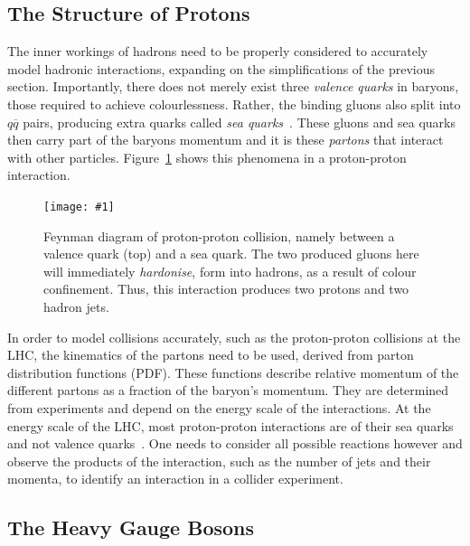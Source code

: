 \documentclass[twocolumn]{article}
\newcommand{\insertFigure}[1]{%
   \texttt{[image: \#1]}%
}
\begin{document}
\subsection{The Structure of Protons} 
The inner workings of hadrons need to be properly considered to accurately model hadronic interactions, expanding on the simplifications of the previous section. Importantly, there does not merely exist three \textsl{valence quarks} in baryons, those required to achieve colourlessness. Rather, the binding gluons also split into $q\overline{q}$ pairs, producing extra quarks called \textsl{sea quarks}~\cite{manual}. These gluons and sea quarks then carry part of the baryons momentum and it is these \textsl{partons} that interact with other particles. Figure~\ref{fig:parton} shows this phenomena in a proton-proton interaction.
\begin{figure}[!h]
	\centering
	\insertFigure{Images/parton.png}
	\caption{Feynman diagram of proton-proton collision, namely between a valence quark (top) and a sea quark. The two produced gluons here will immediately \textsl{hardonise}, form into hadrons, as a result of colour confinement. Thus, this interaction produces two protons and two hadron jets.~\cite{manual}}
	\label{fig:parton}
\end{figure}
In order to model collisions accurately, such as the proton-proton collisions at the LHC, the kinematics of the partons need to be used, derived from parton distribution functions (PDF). These functions describe relative momentum of the different partons as a fraction of the baryon's momentum. They are determined from experiments and depend on the energy scale of the interactions. At the energy scale of the LHC, most proton-proton interactions are of their sea quarks and not valence quarks~\cite{manual}. One needs to consider all possible reactions however and observe the products of the interaction, such as the number of jets and their momenta, to identify an interaction in a collider experiment.

\subsection{The Heavy Gauge Bosons}%
\end{document}
